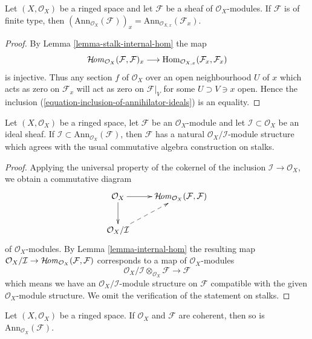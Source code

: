 \begin{lemma}
\label{lemma-finite-type-annihilator-stalk}
Let $(X, \mathcal{O}_X)$ be a ringed space and let
$\mathcal{F}$ be a sheaf of $\mathcal{O}_X$-modules.
If $\mathcal{F}$ is of finite type, then
$(\text{Ann}_{\mathcal{O}_X}(\mathcal{F}))_x =
\text{Ann}_{\mathcal{O}_{X, x}}(\mathcal{F}_x)$.
\end{lemma}

\begin{proof}
By Lemma \ref{lemma-stalk-internal-hom} the map
$$
\mathop{\mathcal{H}\!\mathit{om}}\nolimits_{\mathcal{O}_X}(\mathcal{F}, \mathcal{F})_x \longrightarrow
\mathop{\mathrm{Hom}}\nolimits_{\mathcal{O}_{X,x}}(\mathcal{F}_x, \mathcal{F}_x)
$$
is injective. Thus any section $f$ of $\mathcal{O}_X$ over an open
neighbourhood $U$ of $x$ which acts as zero on $\mathcal{F}_x$
will act as zero on $\mathcal{F}|_V$ for some $U \supset V \ni x$ open.
Hence the inclusion (\ref{equation-inclusion-of-annihilator-ideals})
is an equality.
\end{proof}

\begin{lemma}
\label{lemma-induced-quotient-ring-sheaf-module-structure}
Let $(X, \mathcal{O}_X)$ be a ringed space, let $\mathcal{F}$ be an
$\mathcal{O}_X$-module and let $\mathcal{I} \subset \mathcal{O}_X$
be an ideal sheaf. If
$\mathcal{I} \subset \text{Ann}_{\mathcal{O}_X}(\mathcal{F})$,
then $\mathcal{F}$ has a natural $\mathcal{O}_X/\mathcal{I}$-module structure
which agrees with the usual commutative algebra construction on stalks.
\end{lemma}

\begin{proof}
Applying the universal property of the cokernel of the inclusion
$\mathcal{I} \to \mathcal{O}_X$, we obtain a commutative diagram
$$
\xymatrix{
\mathcal{O}_X \ar[r] \ar[d] &
\SheafHom_{\mathcal{O}_X}(\mathcal{F}, \mathcal{F}) \\
\mathcal{O}_X/\mathcal{I} \ar@{-->}[ur]
}
$$
of $\mathcal{O}_X$-modules. By Lemma \ref{lemma-internal-hom}
the resulting map $\mathcal{O}_X/\mathcal{I} \to
\mathop{\mathcal{H}\!\mathit{om}}\nolimits_{\mathcal{O}_X}(\mathcal{F}, \mathcal{F})$
corresponds to a map of $\mathcal{O}_X$-modules
$$
\mathcal{O}_X/\mathcal{I} \otimes_{\mathcal{O}_X} \mathcal{F}
\longrightarrow
\mathcal{F}
$$
which means we have an $\mathcal{O}_X/\mathcal{I}$-module structure
on $\mathcal{F}$ compatible with the given $\mathcal{O}_X$-module structure.
We omit the verification of the statement on stalks.
\end{proof}

\begin{lemma}
\label{lemma-coherent-annihilator}
\begin{reference}
\cite[Chapter I, \S 2, no. 15, Proposition 9, p. 211]{FAC}
\end{reference}
Let $(X,\mathcal{O}_X)$ be a ringed space.
If $\mathcal{O}_X$ and $\mathcal{F}$ are coherent,
then so is $\text{Ann}_{\mathcal{O}_X}(\mathcal{F})$.
\end{lemma}

